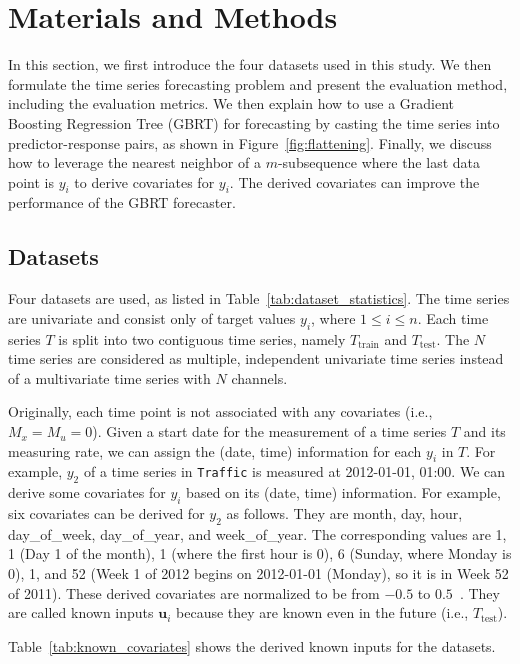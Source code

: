 \section{Materials and Methods} \label{sec:method}

In this section, we first introduce the four datasets used in this study.
We then formulate the time series forecasting problem and present the evaluation method, including the evaluation metrics.
We then explain how to use a Gradient Boosting Regression Tree (GBRT) for forecasting by casting the time series into predictor-response pairs, as shown in Figure~\ref{fig:flattening}.
Finally, we discuss how to leverage the nearest neighbor of a $m$-subsequence where the last data point is $y_i$ to derive covariates for $y_i$.
The derived covariates can improve the performance of the GBRT forecaster.

\subsection{Datasets} %


Four datasets are used, as listed in Table~\ref{tab:dataset_statistics}.
The time series are univariate and consist only of target values $y_i$, where $1 \leq i \leq n$.
Each time series $T$ is split into two contiguous time series, namely $T_\mathrm{train}$ and $T_\mathrm{test}$.
The $N$ time series are considered as multiple, independent univariate time series instead of a multivariate time series with $N$ channels.

Originally, each time point is not associated with any covariates (i.e., $M_x = M_u = 0$).
Given a start date for the measurement of a time series $T$ and its measuring rate, we can assign the (date, time) information for each $y_i$ in $T$.
For example, $y_2$ of a time series in \texttt{Traffic} is measured at 2012-01-01, 01:00.
We can derive some covariates for $y_i$ based on its (date, time) information.
For example, six covariates can be derived for $y_2$ as follows.
They are month, day, hour, day\_of\_week, day\_of\_year, and week\_of\_year.
The corresponding values are 1, 1 (Day 1 of the month), 1 (where the first hour is 0), 6 (Sunday, where Monday is 0), 1, and 52 (Week 1 of 2012 begins on 2012-01-01 (Monday), so it is in Week 52 of 2011).
These derived covariates are normalized to be from $-0.5$ to $0.5$~\cite{elsayed2021we}.
They are called known inputs $\textbf{u}_i$ because they are known even in the future (i.e., $T_\mathrm{test}$).

Table~\ref{tab:known_covariates} shows the derived known inputs for the datasets.

